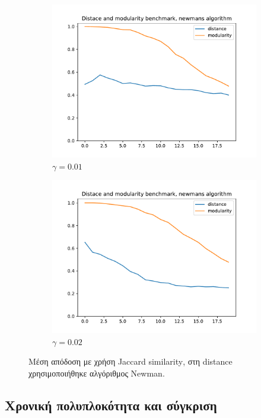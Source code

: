 \documentclass[10pt, letterpaper]{article}
\begin{document}
\begin{figure}[H]
  \begin{subfigure}{0.5\textwidth}
    \centering
    \includegraphics[width=0.8\linewidth]{benchmark_newman_gamma=0.01.pdf}
    \caption{$\gamma = 0.01$}
    \label{fig:bench0.01new}
  \end{subfigure}
  \begin{subfigure}{0.5\textwidth}
    \centering
    \includegraphics[width=0.8\linewidth]{benchmark_newman_gamma=0.02.pdf}
    \caption{$\gamma = 0.02$}
    \label{fig:bench0.02new}
  \end{subfigure}
  \caption{Μέση απόδοση με χρήση \textlatin{Jaccard similarity}, στη \textlatin{distance}
  χρησιμοποιήθηκε αλγόριθμος \textlatin{Newman}.}
  \label{new_2}
\end{figure}





\subsection{Χρονική πολυπλοκότητα και σύγκριση}
\end{document}
